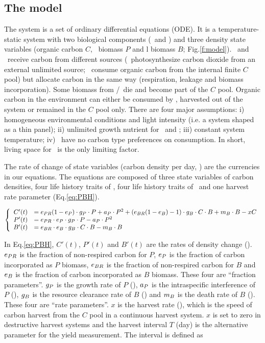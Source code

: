 \documentclass[../thesis.tex]{subfiles} %
\begin{document}
\subsection{The model}
The system is a set of ordinary differential equations (ODE).  It is a temperature-static system with two biological components (\phy\ and \bac) and three density state variables (organic carbon $C$, \phy\ biomass $P$ and \bac l biomass $B$; Fig.\ref{f:model}). \Phy\ and \bac\ receive carbon from different sources (\phy\ photosynthesize carbon dioxide from an external unlimited source; \bac\ consume organic carbon from the internal finite $C$ pool) but allocate carbon in the same way (respiration, leakage and biomass incorporation).  Some biomass from \phy/\bac\ die and become part of the $C$ pool.  Organic carbon in the environment can either be consumed by \bac, harvested out of the system or remained in the $C$ pool only.  There are four major assumptions:  \Rn{1}) homogeneous environmental conditions and light intensity (i.e. a system shaped as a thin panel); \Rn{2}) unlimited growth nutrient for \phy\ and \bac; \Rn{3}) constant system temperature; \Rn{4}) \bac\ have no carbon type preferences on consumption.  In short, living space for \phy\ is the only limiting factor.

The rate of change of state variables (carbon density per day, \dxdt) are the currencies in our equations.  The equations are composed of three state variables of carbon densities, four life history traits of \phy, four life history traits of \bac\ and one harvest rate parameter (Eq.\ref{eq:PBH}).

\begin{equation}\left\{\begin{array}{rl}
    C'(t) &= e_{PR}(1-e_P)\cdot g_P\cdot P +a_P\cdot P^2 +(e_{BR}(1-e_B)-1)\cdot g_B\cdot C\cdot B +m_B\cdot B -xC\\
    P'(t) &= e_{PR}\cdot e_P\cdot g_P\cdot P -a_P\cdot P^2\\
    B'(t) &= e_{BR}\cdot e_B\cdot g_B\cdot C\cdot B -m_B\cdot B
\end{array}\right.\label{eq:PBH}\end{equation}

In Eq.\ref{eq:PBH}, $C'(t)$, $P'(t)$ and $B'(t)$ are the rates of density change (\dxdt).  $e_{PR}$ is the fraction of non-respired carbon for $P$, $e_P$ is the fraction of carbon incorporated as $P$ biomass, $e_{BR}$ is the fraction of non-respired carbon for $B$ and $e_B$ is the fraction of carbon incorporated as $B$ biomass.  These four are ``fraction parameters”.  $g_P$ is the growth rate of $P$ (\dayU), $a_P$ is the intraspecific interference of $P$ (\denI), $g_B$ is the resource clearance rate of $B$  (\denI) and $m_B$ is the death rate of $B$ (\dayU).  These four are ``rate parameters”.  $x$ is the harvest rate (\dayU), which is the speed of carbon harvest from the $C$ pool in a continuous harvest system.  $x$ is set to zero in destructive harvest systems and the harvest interval $T$ (day) is the alternative parameter for the yield measurement.  The interval is defined as
\end{document}
